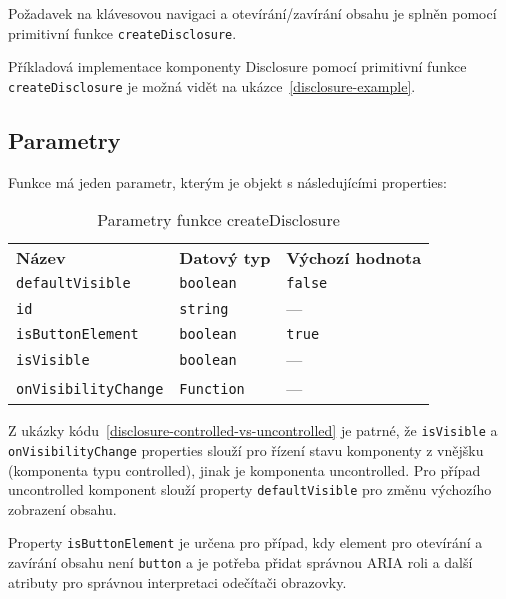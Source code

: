 Požadavek na klávesovou navigaci \hyperref[ofr11]{} a otevírání/zavírání obsahu \hyperref[dfr11]{} je splněn pomocí primitivní funkce \texttt{createDisclosure}.

Příkladová implementace komponenty Disclosure pomocí primitivní funkce \texttt{createDisclosure} je možná vidět na ukázce~\ref{disclosure-example}.

\subsection{Parametry}

Funkce má jeden parametr, kterým je objekt s následujícími properties:

\begin{table}[ht]\label{table:disclosure-params}
    \begin{ctucolortab}
        \begin{tabularx}{\textwidth}{X X X}
            \bfseries Název             & \bfseries Datový typ & \bfseries Výchozí hodnota \\\Midrule{}
            \texttt{defaultVisible}     & \texttt{boolean}     & \texttt{false}            \\
            \texttt{id}                 & \texttt{string}      & ---                       \\
            \texttt{isButtonElement}    & \texttt{boolean}     & \texttt{true}             \\
            \texttt{isVisible}          & \texttt{boolean}     & ---                       \\
            \texttt{onVisibilityChange} & \texttt{Function}    & ---
        \end{tabularx}
    \end{ctucolortab}
    \caption{Parametry funkce createDisclosure}
\end{table}

Z ukázky kódu~\ref{disclosure-controlled-vs-uncontrolled} je patrné, že \texttt{isVisible} a \texttt{onVisibilityChange} properties slouží pro řízení stavu komponenty z vnějšku (komponenta typu controlled), jinak je komponenta uncontrolled.
Pro případ uncontrolled komponent slouží property \texttt{defaultVisible} pro změnu výchozího zobrazení obsahu.

Property \texttt{isButtonElement} je určena pro případ, kdy element pro otevírání a zavírání obsahu není \texttt{button} a je potřeba přidat správnou ARIA roli a další atributy pro správnou interpretaci odečítači obrazovky.

